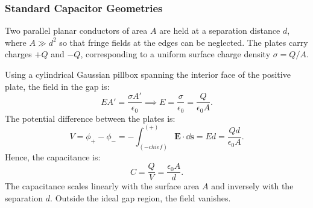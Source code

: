 \subsubsection{Standard Capacitor Geometries}

\begin{example}
    Two parallel planar conductors of area \(A\) are held at a separation distance \(d\), where \(A \gg d^2\) so that fringe fields at the edges can be neglected. The plates carry charges \(+Q\) and \(-Q\), corresponding to a uniform surface charge density \(\sigma = Q/A\).
    
    Using a cylindrical Gaussian pillbox spanning the interior face of the positive plate, the field in the gap is:
    \begin{equation}
        E A' = \frac{\sigma A'}{\epsilon_0} \implies E = \frac{\sigma}{\epsilon_0} = \frac{Q}{\epsilon_0 A}.
    \end{equation}
    The potential difference between the plates is:
    \begin{equation}
        V = \phi_+ - \phi_- = -\int_{(- chief)}^{(+)} \bm{E}\cdot\dd\bm{s} = E d = \frac{Q d}{\epsilon_0 A}.
    \end{equation}
    Hence, the capacitance is:
    \begin{equation}
        C = \frac{Q}{V} = \frac{\epsilon_0 A}{d}.
    \end{equation}
    The capacitance scales linearly with the surface area \(A\) and inversely with the separation \(d\). Outside the ideal gap region, the field vanishes.
\end{example}

